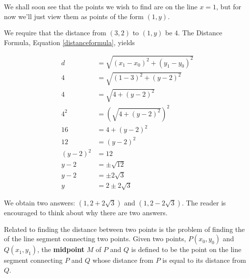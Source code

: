 {
We shall soon see that the points we wish to find are on the line $x=1$, but for now we'll just view them as points of the form $(1,y)$.  

We require that the distance from $(3,2)$ to $(1,y)$ be $4$.  The Distance Formula, Equation \ref{distanceformula}, yields

\begin{align*} 
d &  =  \sqrt{\left(x_{1}-x_{0}\right)^2+\left(y_{1}-y_{0}\right)^2} \\
4 &  =  \sqrt{(1-3)^2+(y-2)^2}  \\
4  & =  \sqrt{4+(y-2)^2}  \\ 
4^2 & =  \left(\sqrt{4+(y-2)^2}\right)^2   \tag*{squaring both sides} \\
16 & =  4+(y-2)^2 \\
12 & =  (y-2)^2  \\
(y-2)^2 & =  12   \\
y - 2 & =  \pm \sqrt{12} \tag*{extracting the square root} \\
y-2 & =  \pm 2 \sqrt{3}  \\
y & =  2 \pm 2 \sqrt{3}   
\end{align*}


We obtain two answers:  $(1, 2 + 2 \sqrt{3})$ and $(1, 2-2 \sqrt{3}).$  The reader is encouraged to think about why there are two answers.}


\medskip

Related to finding the distance between two points is the problem of finding the   of the line segment connecting two points.  Given two points, $P\left(x_{0}, y_{0}\right)$ and $Q\left(x_{1}, y_{1}\right)$, the \textbf{midpoint} $M$  of $P$ and $Q$ is defined to be the point on the line segment connecting $P$ and $Q$ whose distance from $P$ is equal to its distance from  $Q$.  


